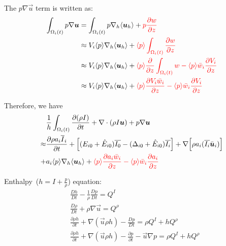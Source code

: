 \documentclass{report}
\begin{document}
The $p \nabla \vec{u}$ term is written as:
\begin{align*}
    \int_{\Omega_i(t)} p \nabla\vec{u}
    &= \int_{\Omega_i(t)} p\nabla_h \langle\vec{u}_h\rangle + {\color{red}p \frac{\partial w}{\partial z}} \\
    &\approx V_i \langle p \rangle\nabla_h \langle\vec{u}_h\rangle + {\color{red}\langle p \rangle \int_{\Omega_i(t)}  \frac{\partial w}{\partial z}} \\
    &\approx V_i \langle p \rangle\nabla_h \langle\vec{u}_h\rangle + {\color{red}\langle p \rangle \frac{\partial }{\partial z} \int_{\Omega_i(t)}  w  - \langle p \rangle \bar{w}_i \frac{\partial V_i}{\partial z}}\\
    &\approx V_i \langle p \rangle\nabla_h \langle\vec{u}_h\rangle + {\color{red}\langle p \rangle \frac{\partial V_i \bar{w}_i}{\partial z}  - \langle p \rangle \bar{w}_i \frac{\partial V_i}{\partial z}}\\
\end{align*}

Therefore, we have 
\begin{align*}
  & \frac{1}{h}\int_{\Omega_i(t)}\diff{(\rho I)}{t} + \divergence \left( \rho I\vec{u}\right)  + p\nabla\vec{u}\\
 \approx& \frac{\partial \rho a_i \overline{I}_i}{\partial t} 
 + \Big[(E_{i0} + \hat{E}_{i0}) \overline{I_0}  - (\Delta_{i0} + \hat{E}_{i0}) \overline{I_i} \Big]
 + \nabla\Big[\rho a_i(\overline{I_i} \bar{\vec{u}}_i)\Big] \\
 +&  a_i \langle p \rangle \nabla_h \langle\vec{u}_h\rangle
    +  {\color{red} \langle p \rangle\frac{\partial  a_i \bar{w}_i}{\partial z}  -  \langle p\rangle \bar{w}_i \frac{\partial a_i}{\partial z} } \\
\end{align*}



\newpage
Enthalpy~($h = I + \frac{p}{\rho}$) equation:
\begin{align*}
 &\frac{D h}{D t} - \frac{1}{\rho} \frac{Dp}{Dt} = Q^{I}\\
 &\frac{D \rho}{D t} + \rho\nabla \vec{u}  = Q^{\rho}\\
 &\frac{\partial \rho h}{\partial t} + \nabla\left(\vec{u}\rho h\right) -  \frac{Dp}{Dt} = \rho Q^{I} + hQ^{\rho}\\
 &\frac{\partial \rho h}{\partial t} + \nabla\left(\vec{u}\rho h\right) -  \frac{\partial p}{\partial t} - \vec{u}\nabla p = \rho Q^{I} + hQ^{\rho}\\
\end{align*}
\end{document}
